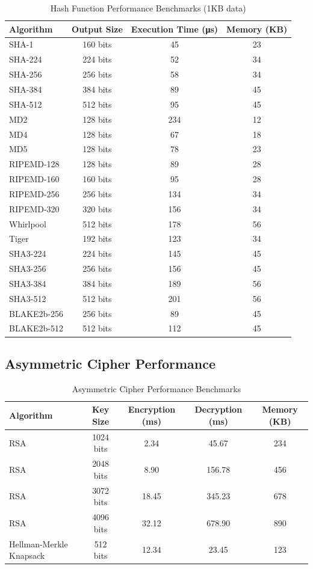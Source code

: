 \documentclass[12pt,a4paper]{article}
\begin{document}
\begin{table}[h]
\centering
\caption{Hash Function Performance Benchmarks (1KB data)}
\begin{tabular}{|l|c|c|c|}
\hline
\textbf{Algorithm} & \textbf{Output Size} & \textbf{Execution Time (μs)} & \textbf{Memory (KB)} \\
\hline
SHA-1 & 160 bits & 45 & 23 \\
SHA-224 & 224 bits & 52 & 34 \\
SHA-256 & 256 bits & 58 & 34 \\
SHA-384 & 384 bits & 89 & 45 \\
SHA-512 & 512 bits & 95 & 45 \\
\hline
MD2 & 128 bits & 234 & 12 \\
MD4 & 128 bits & 67 & 18 \\
MD5 & 128 bits & 78 & 23 \\
\hline
RIPEMD-128 & 128 bits & 89 & 28 \\
RIPEMD-160 & 160 bits & 95 & 28 \\
RIPEMD-256 & 256 bits & 134 & 34 \\
RIPEMD-320 & 320 bits & 156 & 34 \\
\hline
Whirlpool & 512 bits & 178 & 56 \\
Tiger & 192 bits & 123 & 34 \\
\hline
SHA3-224 & 224 bits & 145 & 45 \\
SHA3-256 & 256 bits & 156 & 45 \\
SHA3-384 & 384 bits & 189 & 56 \\
SHA3-512 & 512 bits & 201 & 56 \\
\hline
BLAKE2b-256 & 256 bits & 89 & 45 \\
BLAKE2b-512 & 512 bits & 112 & 45 \\
\hline
\end{tabular}
\end{table}

\subsection{Asymmetric Cipher Performance}

\begin{table}[h]
\centering
\caption{Asymmetric Cipher Performance Benchmarks}
\begin{tabular}{|l|c|c|c|c|}
\hline
\textbf{Algorithm} & \textbf{Key Size} & \textbf{Encryption (ms)} & \textbf{Decryption (ms)} & \textbf{Memory (KB)} \\
\hline
RSA & 1024 bits & 2.34 & 45.67 & 234 \\
RSA & 2048 bits & 8.90 & 156.78 & 456 \\
RSA & 3072 bits & 18.45 & 345.23 & 678 \\
RSA & 4096 bits & 32.12 & 678.90 & 890 \\
\hline
Hellman-Merkle Knapsack & 512 bits & 12.34 & 23.45 & 123 \\
\hline
\end{tabular}
\end{table}
\end{document}
